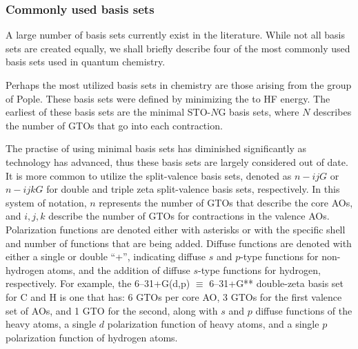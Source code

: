 \subsubsection{Commonly used basis sets}

A large number of basis sets currently exist in the
literature.\cite{Jensen2012} While not all basis sets are created equally, we
shall briefly describe four of the most commonly used basis sets used in
quantum chemistry.

\vspace{3mm}
\vspace{1mm}

Perhaps the most utilized basis sets in chemistry are those arising from the
group of Pople.\cite{Hehre1969, Ditchfield1971, Hehre1972} These basis sets were
defined by minimizing the  to HF energy. The earliest of these basis sets are
the minimal STO-$N$G basis sets, where $N$ describes the number of GTOs that go
into each contraction.

The practise of using minimal basis sets has diminished significantly as
technology has advanced, thus these basis sets are largely considered out of
date. It is more common to utilize the split-valence basis sets, denoted as
$n-ijG$ or $n-ijkG$ for double and triple zeta split-valence basis sets,
respectively. In this system of notation, $n$ represents the number of GTOs that
describe the core AOs, and $i, j, k$ describe the number of GTOs for
contractions in the valence AOs. Polarization functions are denoted either with
asterisks or with the specific shell and number of functions that are being
added. Diffuse functions are denoted with either a single or double ``+'',
indicating diffuse $s$ and $p$-type functions for non-hydrogen atoms, and the
addition of diffuse $s$-type functions for hydrogen, respectively. For example,
the 6--31+G(d,p) $\equiv$ 6--31+G** double-zeta basis set for C and H is one
that has: 6 GTOs per core AO, 3 GTOs for the first valence set of AOs, and 1 GTO
for the second, along with $s$ and $p$ diffuse functions of the heavy atoms, a
single $d$ polarization function of heavy atoms, and a single $p$ polarization
function of hydrogen atoms.

\vspace{3mm}
\vspace{1mm}

